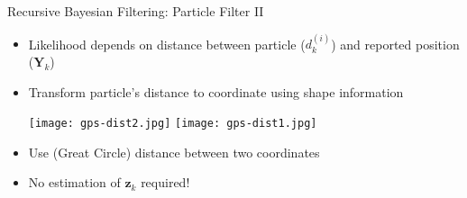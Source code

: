 \documentclass[10pt,t]{beamer}
\newcommand{\bY}{\mathbf{Y}}
\renewcommand{\vec}[1]{\boldsymbol{#1}}
\begin{document}
\begin{frame}{Recursive Bayesian Filtering: Particle Filter II}
  \begin{itemize}[<+->]
  \item Likelihood depends on distance between particle ($d_k^{(i)}$) and reported position ($\bY_k$)
  \item Transform particle's distance to coordinate using shape information
    
    \texttt{[image: gps-dist2.jpg]}
    \texttt{[image: gps-dist1.jpg]} 
    
  \item Use (Great Circle) distance between two coordinates
  \item No estimation of $\vec{z}_k$ required!
  \end{itemize}
\end{frame}
\end{document}
